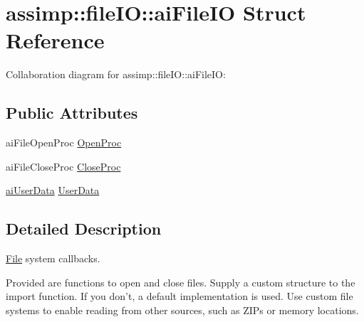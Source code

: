 \hypertarget{structassimp_1_1file_i_o_1_1ai_file_i_o}{\section{assimp\+:\+:file\+I\+O\+:\+:ai\+File\+I\+O Struct Reference}
\label{structassimp_1_1file_i_o_1_1ai_file_i_o}
}


Collaboration diagram for assimp\+:\+:file\+I\+O\+:\+:ai\+File\+I\+O\+:
\subsection*{Public Attributes}
\begin{DoxyCompactItemize}
\item 
ai\+File\+Open\+Proc \hyperlink{structassimp_1_1file_i_o_1_1ai_file_i_o_ad8781f065fd63d43c93eab38165fb85a}{Open\+Proc}
\item 
ai\+File\+Close\+Proc \hyperlink{structassimp_1_1file_i_o_1_1ai_file_i_o_af31e2165b495651e8230c01983cca077}{Close\+Proc}
\item 
\hyperlink{namespaceassimp_1_1file_i_o_a8ab7edca38824d46ea9dfca09a051809}{ai\+User\+Data} \hyperlink{structassimp_1_1file_i_o_1_1ai_file_i_o_a361f425266a5926d5188cec69a5cf319}{User\+Data}
\end{DoxyCompactItemize}


\subsection{Detailed Description}
\hyperlink{class_file}{File} system callbacks.

Provided are functions to open and close files. Supply a custom structure to the import function. If you don't, a default implementation is used. Use custom file systems to enable reading from other sources, such as Z\+I\+Ps or memory locations. 

